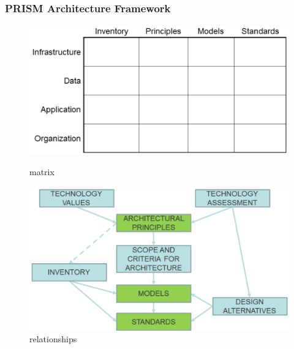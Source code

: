 \documentclass[aspectratio=169, table]{beamer}
\begin{document}
    {
        \begin{frame}
            \frametitle{PRISM Architecture Framework}
            \begin{center}

                \begin{figure}[ht]
                    \begin{minipage}[b]{0.49\linewidth}
                        \centering
                        \includegraphics[width=\textwidth]{../figures/prism_matrix}
                        \caption{matrix}
                    \end{minipage}
                    \hfill
                    \begin{minipage}[b]{0.49\linewidth}
                        \centering
                        \includegraphics[width=\textwidth]{../figures/prism_relationships}
                        \caption{relationships}
                    \end{minipage}
                \end{figure}

            \end{center}
        \end{frame}
    }
\end{document}
